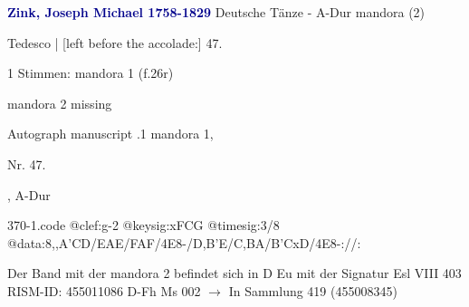 \documentclass[twocolumn]{book}
\begin{document}
\newline \par \vspace{7pt} \textcolor{darkblue}{\textbf{Zink, Joseph Michael  1758-1829}}
\newline Deutsche Tänze - A-Dur
\newline mandora (2)
\newline \begin{itshape}[f.26r, at left:] Tedesco | [left before the accolade:] 47.\end{itshape} 
\newline \textcolor{darkblue}{}  1 Stimmen: mandora 1  (f.26r)
\newline \begin{small} mandora 2 missing\end{small} 
\newline Autograph manuscript
.1  mandora 1, \begin{itshape}Nr. 47.\end{itshape}, A-Dur  
\begin{filecontents*}{370-1.code}
@clef:g-2
@keysig:xFCG
@timesig:3/8
@data:8,,A'CD/EAE/FAF/4E8-/D,B'E/C,BA/B'CxD/4E8-://:
\end{filecontents*}
\newline
%
\newline Der Band mit der mandora 2 befindet sich in D Eu mit der Signatur Esl VIII 403
\newline RISM-ID: 455011086
\newline D-Fh  Ms 002
\newline $\rightarrow$ In Sammlung 419 (455008345)
      
\end{document}
